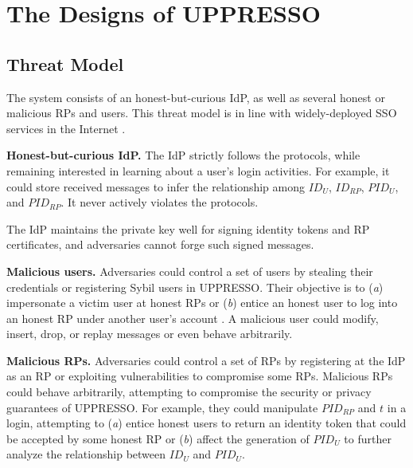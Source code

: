 \section{The Designs of UPPRESSO}
\label{sec:UPPRESSO}


\subsection{Threat Model}
\label{subsec:threatmodel}
The system consists of an honest-but-curious IdP, as well as several honest or malicious RPs and users. This threat model is in line with widely-deployed SSO services in the Internet \cite{OpenIDConnect,rfc6749, SAML, SAMLIdentifier}.


\noindent \textbf{Honest-but-curious IdP.} The IdP strictly follows the protocols,
 while remaining interested in learning about a user's login activities.
For example, it could store received messages to infer the relationship among $ID_U$, $ID_{RP}$, $PID_{U}$, and $PID_{RP}$.
It never actively violates the protocols.

The IdP maintains the private key well for signing identity tokens and RP certificates, %
and adversaries cannot forge such signed messages.


\noindent \textbf{Malicious users.} Adversaries could control a set of users by stealing their credentials or registering Sybil users in UPPRESSO.
 Their objective is to (\emph{a}) impersonate a victim user at honest RPs or (\emph{b}) entice an honest user to log into an honest RP under another user's account  \cite{SPRESSO, FettKS14}.
A malicious user could modify, insert, drop, or replay messages or even behave arbitrarily.

\noindent \textbf{Malicious RPs.}
Adversaries could control a set of RPs by registering at the IdP as an RP or exploiting vulnerabilities to compromise some RPs.
Malicious RPs could behave arbitrarily, attempting to compromise the security or privacy guarantees of UPPRESSO.
For example, they could manipulate $PID_{RP}$ and $t$ in a login, attempting to (\emph{a}) entice honest users to return an identity token that could be accepted by some honest RP or (\emph{b}) affect the generation of $PID_U$ to further analyze the relationship between $ID_U$ and $PID_U$.


